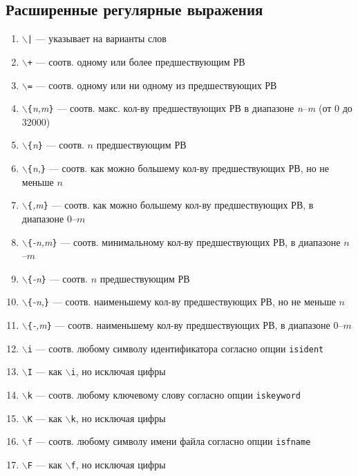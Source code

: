 \documentclass[a4paper,10pt, twocolumn]{article}
\newcommand*{\cod}[1]{\texttt{#1}}
\begin{document}
\subsection{Расширенные регулярные выражения}
\begin{enumerate}
    \item \cod{$\backslash$|} --- указывает на варианты слов
    \item \cod{$\backslash$+} --- соотв. одному или более предшествующим РВ
    \item \cod{$\backslash$=} --- соотв. одному или ни одному из предшествующих РВ
    \item \cod{$\backslash$\{}\textit{n,m}\cod{\}} --- соотв. макс. кол-ву предшествующих РВ в диапазоне \textit{n}--\textit{m} (от 0 до 32000)
    \item \cod{$\backslash$\{}\textit{n}\cod{\}} --- соотв. $n$ предшествующим РВ
    \item \cod{$\backslash$\{}\textit{n,}\cod{\}} --- соотв. как можно большему кол-ву предшествующих РВ, но не меньше $n$
    \item \cod{$\backslash$\{}\textit{,m}\cod{\}} --- соотв. как можно большему кол-ву предшествующих РВ, в диапазоне $0$--$m$
    \item \cod{$\backslash$\{}\textit{-n,m}\cod{\}} --- соотв. минимальному кол-ву предшествующих РВ, в диапазоне $n$--$m$ 
    \item \cod{$\backslash$\{}\textit{-n}\cod{\}} --- соотв. $n$ предшествующим РВ
    \item \cod{$\backslash$\{}\textit{-n,}\cod{\}} --- соотв. наименьшему кол-ву предшествующих РВ, но не меньше $n$
    \item \cod{$\backslash$\{}\textit{-,m}\cod{\}} --- соотв. наименьшему кол-ву предшествующих РВ, в диапазоне $0$--$m$ 
    \item \cod{$\backslash$i} --- соотв. любому символу идентификатора согласно опции \cod{isident}
    \item \cod{$\backslash$I} --- как \cod{$\backslash$i}, но исключая цифры
    \item \cod{$\backslash$k} --- соотв. любому ключевому слову согласно опции \cod{iskeyword}
    \item \cod{$\backslash$K} --- как \cod{$\backslash$k}, но исключая цифры
    \item \cod{$\backslash$f} --- соотв. любому символу имени файла согласно опции \cod{isfname}
    \item \cod{$\backslash$F} --- как \cod{$\backslash$f}, но исключая цифры

\end{enumerate}
\end{document}
